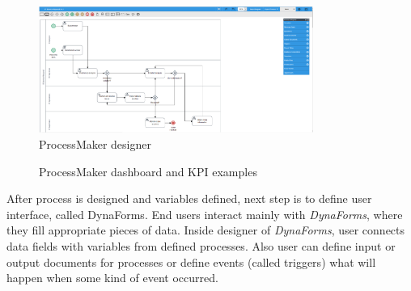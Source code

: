  \begin{figure}[ht!]
	\centering
    \includegraphics[width=0.8\textwidth, keepaspectratio]{img/process-maker-designer.PNG}
    \caption{ProcessMaker designer}
    \label{fig:process-maker-designer}
\end{figure} 
 
\begin{figure}[ht!]
    \centering
    \qquad
    \caption{ProcessMaker dashboard and KPI examples}%
    \label{fig:process-maker-dashboard}%
\end{figure}

 After process is designed and variables defined, next step is to define user interface, called DynaForms. End users interact mainly with \textit{DynaForms}, where they fill appropriate pieces of data. 
 Inside designer of \textit{DynaForms}, user connects data fields with variables from defined processes. Also user can define input or output documents for processes or define events (called triggers) what will happen when some kind of event occurred.
 
